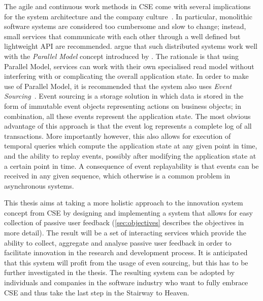 The agile and continuous work methods in \ac{CSE} come with several implications for the system architecture and the company culture~\cite{Lindgren2015,Olsson2012}.
In particular, monolithic software systems are considered too cumbersome and slow to change; instead, small services that communicate with each other through a well defined but lightweight API are recommended.
\citet{ford2017building} argue that such distributed systems work well with the \emph{Parallel Model} concept introduced by \citet{WEB:Fowler:2005-2}.
The rationale is that using Parallel Model, services can work with their own specialised read model without interfering with or complicating the overall application state.
In order to make use of Parallel Model, it is recommended that the system also uses \emph{Event Sourcing}~\cite{WEB:Fowler:2005,WEB:Fowler:2005-2}.
Event sourcing is a storage solution in which data is stored in the form of immutable event objects representing actions on business objects; in combination, all these events represent the application state.
The most obvious advantage of this approach is that the event log represents a complete log of all transactions.
More importantly however, this also allows for execution of temporal queries which compute the application state at any given point in time, and the ability to replay events, possibly after modifying the application state at a certain point in time.
A consequence of event replayability is that events can be received in any given sequence, which otherwise is a common problem in asynchronous systems.

This thesis aims at taking a more holistic approach to the innovation system concept from \ac{CSE} by designing and implementing a system that allows for easy collection of passive user feedback (\cref{sec:objectives} describes the objectives in more detail).
The result will be a set of interacting services which provide the ability to collect, aggregate and analyse passive user feedback in order to facilitate innovation in the research and development process.
It is anticipated that this system will profit from the usage of even sourcing, but this has to be further investigated in the thesis.
The resulting system can be adopted by individuals and companies in the software industry who want to fully embrace \ac{CSE} and thus take the last step in the Stairway to Heaven.
